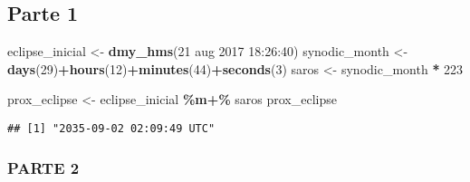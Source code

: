 \documentclass[
]{article}
\newenvironment{Shaded}{\begin{snugshade}}{\end{snugshade}}
\newcommand{\DecValTok}[1]{\textcolor[rgb]{0.00,0.00,0.81}{#1}}
\newcommand{\FunctionTok}[1]{\textcolor[rgb]{0.13,0.29,0.53}{\textbf{#1}}}
\newcommand{\NormalTok}[1]{#1}
\newcommand{\OtherTok}[1]{\textcolor[rgb]{0.56,0.35,0.01}{#1}}
\newcommand{\SpecialCharTok}[1]{\textcolor[rgb]{0.81,0.36,0.00}{\textbf{#1}}}
\newcommand{\StringTok}[1]{\textcolor[rgb]{0.31,0.60,0.02}{#1}}
\begin{document}
\hypertarget{parte-1}{%
\subsection{Parte 1}\label{parte-1}}

\begin{Shaded}
\begin{Highlighting}[]
\NormalTok{eclipse\_inicial }\OtherTok{\textless{}{-}} \FunctionTok{dmy\_hms}\NormalTok{(}\StringTok{\textquotesingle{}21 aug 2017 18:26:40\textquotesingle{}}\NormalTok{)}
\NormalTok{synodic\_month }\OtherTok{\textless{}{-}} \FunctionTok{days}\NormalTok{(}\DecValTok{29}\NormalTok{)}\SpecialCharTok{+}\FunctionTok{hours}\NormalTok{(}\DecValTok{12}\NormalTok{)}\SpecialCharTok{+}\FunctionTok{minutes}\NormalTok{(}\DecValTok{44}\NormalTok{)}\SpecialCharTok{+}\FunctionTok{seconds}\NormalTok{(}\DecValTok{3}\NormalTok{)}
\NormalTok{saros }\OtherTok{\textless{}{-}}\NormalTok{ synodic\_month }\SpecialCharTok{*} \DecValTok{223}

\NormalTok{prox\_eclipse }\OtherTok{\textless{}{-}}\NormalTok{ eclipse\_inicial }\SpecialCharTok{\%m+\%}\NormalTok{ saros}
\NormalTok{prox\_eclipse}
\end{Highlighting}
\end{Shaded}

\begin{verbatim}
## [1] "2035-09-02 02:09:49 UTC"
\end{verbatim}

\hypertarget{parte-2}{%
\subsubsection{PARTE 2}\label{parte-2}}
\end{document}
